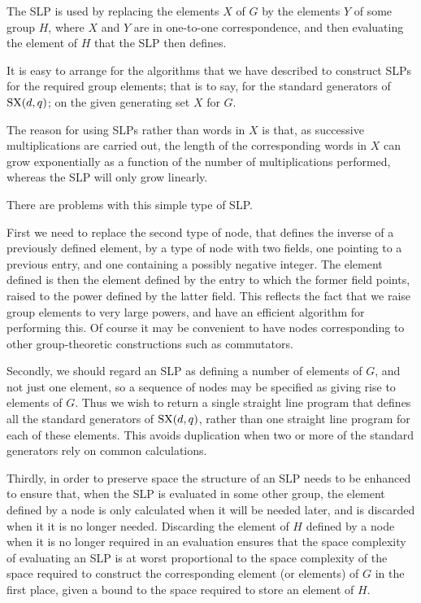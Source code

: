 \documentclass[12pt]{article}
\def\SX{{\rm SX}}
\begin{document}
The SLP is used by replacing the elements $X$ of $G$ by the elements $Y$ of some group
$H$, where $X$ and $Y$ are in one-to-one correspondence, and then evaluating the
element of $H$ that the SLP then defines.

It is easy to arrange for the algorithms that we have described to construct SLPs
for the required group elements; that is to say, for the standard generators of $\SX(d,q)$; on the given generating set $X$ for $G$.

The reason for using SLPs rather than words in $X$ is that, as successive
multiplications are carried out, the length of the corresponding words in $X$ can grow exponentially
as a function of the number of multiplications performed, whereas the SLP will only
grow linearly.

There are problems with this simple type of SLP.

First we need to replace the second type of node, that defines the inverse of a previously
defined element, by a type of node with two fields, one pointing to a previous entry, and one containing 
a possibly negative integer.  The element defined is then the element defined by the entry to which
the former field points, raised to the power defined by the latter field.  This reflects the fact that we
raise group elements to very large powers, and have an efficient algorithm for performing this.
Of course it may be convenient to have nodes corresponding to other group-theoretic
constructions such as commutators.

Secondly, we should regard an SLP as defining a number of elements of $G$,
and not just one element, so a sequence of nodes may be specified as giving rise to elements
of $G$.  Thus we wish to return a single straight line program that defines all the standard
generators of $\SX(d,q)$, rather than one straight line program for each of these elements.
This avoids duplication when two or more of the standard generators rely on common calculations.

Thirdly, in order to preserve space the structure of an SLP needs to be enhanced to ensure that, when the
SLP is evaluated in some other group, the element defined by a node is only calculated when it
will be needed later, and is discarded when it it is no longer needed.  Discarding the element of $H$ defined by a node when it is no longer required in an evaluation ensures that the space complexity of evaluating an SLP is at worst proportional to the space complexity of the space required to construct the corresponding element (or elements) of $G$ in the first place, given a bound to the space required to store an element of $H$.
\end{document}
